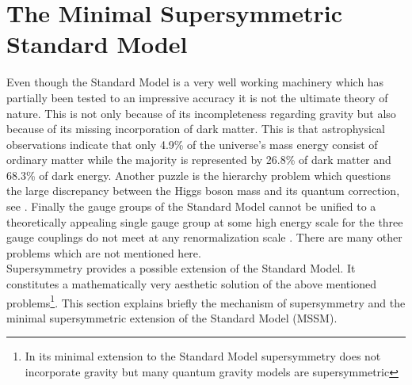 \section{The Minimal Supersymmetric Standard Model}
Even though the Standard Model is a very well working machinery which has partially been tested to an impressive accuracy it is not the ultimate theory of nature. This is not only because of its incompleteness regarding gravity but also because of its missing incorporation of dark matter. This is that astrophysical observations \cite{Adam:2015rua} indicate that only 4.9\% of the universe's mass energy consist of ordinary matter while the majority is represented by 26.8\% of dark matter and 68.3\% of dark energy. Another puzzle is the hierarchy problem which questions the large discrepancy between the Higgs boson mass and its quantum correction, see \cite{Martin:1997ns}. Finally the gauge groups of the Standard Model cannot be unified to a theoretically appealing single gauge group at some high energy scale for the three gauge couplings do not meet at any renormalization scale \cite{Martin:1997ns}. There are many other problems which are not mentioned here.\\
Supersymmetry provides a possible extension of the Standard Model. It constitutes a mathematically very aesthetic solution of the above mentioned problems\footnote{In its minimal extension to the Standard Model supersymmetry does not incorporate gravity but many quantum gravity models are supersymmetric}. This section explains briefly the mechanism of supersymmetry and the minimal supersymmetric extension of the Standard Model (MSSM).


